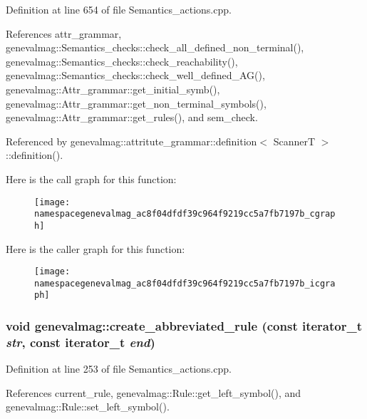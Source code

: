 Definition at line 654 of file Semantics\_\-actions.cpp.



References attr\_\-grammar, genevalmag::Semantics\_\-checks::check\_\-all\_\-defined\_\-non\_\-terminal(), genevalmag::Semantics\_\-checks::check\_\-reachability(), genevalmag::Semantics\_\-checks::check\_\-well\_\-defined\_\-AG(), genevalmag::Attr\_\-grammar::get\_\-initial\_\-symb(), genevalmag::Attr\_\-grammar::get\_\-non\_\-terminal\_\-symbols(), genevalmag::Attr\_\-grammar::get\_\-rules(), and sem\_\-check.



Referenced by genevalmag::attritute\_\-grammar::definition$<$ ScannerT $>$::definition().



Here is the call graph for this function:\nopagebreak
\begin{figure}[H]
\begin{center}
\leavevmode
\texttt{[image: namespacegenevalmag\_ac8f04dfdf39c964f9219cc5a7fb7197b\_cgraph]}
\end{center}
\end{figure}




Here is the caller graph for this function:\nopagebreak
\begin{figure}[H]
\begin{center}
\leavevmode
\texttt{[image: namespacegenevalmag\_ac8f04dfdf39c964f9219cc5a7fb7197b\_icgraph]}
\end{center}
\end{figure}


\hypertarget{namespacegenevalmag_abd826b7a45bf0c29f45dc8f8c64c0805}{
\subsubsection[{create\_\-abbreviated\_\-rule}]{\setlength{\rightskip}{0pt plus 5cm}void genevalmag::create\_\-abbreviated\_\-rule (const iterator\_\-t {\em str}, \/  const iterator\_\-t {\em end})}}
\label{namespacegenevalmag_abd826b7a45bf0c29f45dc8f8c64c0805}


Definition at line 253 of file Semantics\_\-actions.cpp.



References current\_\-rule, genevalmag::Rule::get\_\-left\_\-symbol(), and genevalmag::Rule::set\_\-left\_\-symbol().



